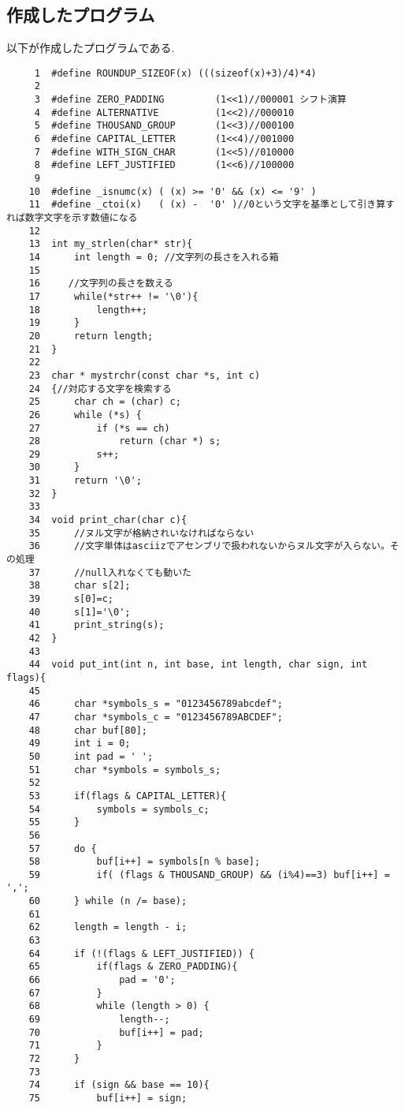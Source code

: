\documentclass[a4j,11pt]{jarticle}
\begin{document}
  \subsection{作成したプログラム}
以下が作成したプログラムである.
\begin{verbatim}
     1	#define ROUNDUP_SIZEOF(x) (((sizeof(x)+3)/4)*4)
     2	
     3	#define ZERO_PADDING         (1<<1)//000001 シフト演算
     4	#define ALTERNATIVE          (1<<2)//000010
     5	#define THOUSAND_GROUP       (1<<3)//000100
     6	#define CAPITAL_LETTER       (1<<4)//001000
     7	#define WITH_SIGN_CHAR       (1<<5)//010000
     8	#define LEFT_JUSTIFIED       (1<<6)//100000
     9	
    10	#define _isnumc(x) ( (x) >= '0' && (x) <= '9' )
    11	#define _ctoi(x)   ( (x) -  '0' )//0という文字を基準として引き算すれば数字文字を示す数値になる
    12	
    13	int my_strlen(char* str){
    14	    int length = 0; //文字列の長さを入れる箱
    15	 
    16	   //文字列の長さを数える
    17	    while(*str++ != '\0'){
    18	        length++;
    19	    }
    20	    return length;
    21	}
    22	
    23	char * mystrchr(const char *s, int c)
    24	{//対応する文字を検索する
    25	    char ch = (char) c;
    26	    while (*s) {
    27	        if (*s == ch)
    28	            return (char *) s;
    29	        s++;
    30	    }
    31	    return '\0';
    32	}
    33	
    34	void print_char(char c){
    35	    //ヌル文字が格納されいなければならない
    36	    //文字単体はasciizでアセンブリで扱われないからヌル文字が入らない。その処理
    37	    //null入れなくても動いた
    38	    char s[2];
    39	    s[0]=c;
    40	    s[1]='\0';
    41	    print_string(s);
    42	}
    43	
    44	void put_int(int n, int base, int length, char sign, int flags){
    45	
    46	    char *symbols_s = "0123456789abcdef";
    47	    char *symbols_c = "0123456789ABCDEF";
    48	    char buf[80];
    49	    int i = 0;
    50	    int pad = ' ';
    51	    char *symbols = symbols_s;
    52	
    53	    if(flags & CAPITAL_LETTER){
    54	        symbols = symbols_c;
    55	    }
    56	
    57	    do {
    58	        buf[i++] = symbols[n % base];
    59	        if( (flags & THOUSAND_GROUP) && (i%4)==3) buf[i++] = ',';
    60	    } while (n /= base);
    61	
    62	    length = length - i;
    63	
    64	    if (!(flags & LEFT_JUSTIFIED)) {
    65	        if(flags & ZERO_PADDING){
    66	            pad = '0';
    67	        }
    68	        while (length > 0) { 
    69	            length--; 
    70	            buf[i++] = pad;
    71	        }
    72	    }
    73	
    74	    if (sign && base == 10){
    75	        buf[i++] = sign;

\end{verbatim}
\end{document}
